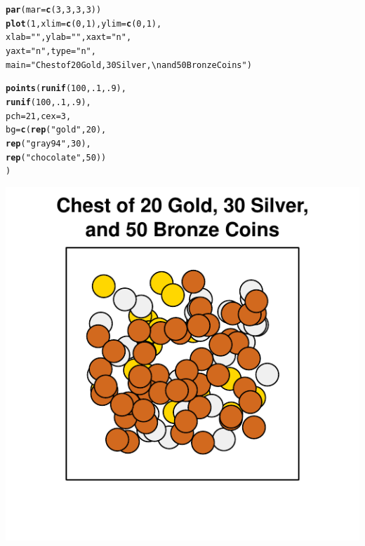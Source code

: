 \documentclass{tufte-book}\usepackage[]{graphicx}\usepackage[]{color}
\makeatletter
\def\maxwidth{ %
  \ifdim\Gin@nat@width>\linewidth
    \linewidth
  \else
    \Gin@nat@width
  \fi
}
\newcommand{\hlnum}[1]{\textcolor[rgb]{0.686,0.059,0.569}{#1}}%
\newcommand{\hlstr}[1]{\textcolor[rgb]{0.192,0.494,0.8}{#1}}%
\newcommand{\hlstd}[1]{\textcolor[rgb]{0.345,0.345,0.345}{#1}}%
\newcommand{\hlkwc}[1]{\textcolor[rgb]{0.333,0.667,0.333}{#1}}%
\newcommand{\hlkwd}[1]{\textcolor[rgb]{0.737,0.353,0.396}{\textbf{#1}}}%
\newenvironment{kframe}{%
 \def\at@end@of@kframe{}%
 \ifinner\ifhmode%
  \def\at@end@of@kframe{\end{minipage}}%
  \begin{minipage}{\columnwidth}%
 \fi\fi%
 \def\FrameCommand##1{\hskip\@totalleftmargin \hskip-\fboxsep
 \colorbox{shadecolor}{##1}\hskip-\fboxsep
     \hskip-\linewidth \hskip-\@totalleftmargin \hskip\columnwidth}%
 \MakeFramed {\advance\hsize-\width
   \@totalleftmargin\z@ \linewidth\hsize
   \@setminipage}}%
 {\par\unskip\endMakeFramed%
 \at@end@of@kframe}
\newenvironment{knitrout}{}{} %
\makeatother
\begin{document}
\begin{marginfigure}
\begin{tiny}
\begin{knitrout}
\color{fgcolor}\begin{kframe}
\begin{alltt}
\hlkwd{par}\hlstd{(}\hlkwc{mar} \hlstd{=} \hlkwd{c}\hlstd{(}\hlnum{3}\hlstd{,} \hlnum{3}\hlstd{,} \hlnum{3}\hlstd{,} \hlnum{3}\hlstd{))}
\hlkwd{plot}\hlstd{(}\hlnum{1}\hlstd{,} \hlkwc{xlim} \hlstd{=} \hlkwd{c}\hlstd{(}\hlnum{0}\hlstd{,} \hlnum{1}\hlstd{),} \hlkwc{ylim} \hlstd{=} \hlkwd{c}\hlstd{(}\hlnum{0}\hlstd{,} \hlnum{1}\hlstd{),}
     \hlkwc{xlab} \hlstd{=} \hlstr{""}\hlstd{,} \hlkwc{ylab} \hlstd{=} \hlstr{""}\hlstd{,} \hlkwc{xaxt} \hlstd{=} \hlstr{"n"}\hlstd{,}
     \hlkwc{yaxt} \hlstd{=} \hlstr{"n"}\hlstd{,} \hlkwc{type} \hlstd{=} \hlstr{"n"}\hlstd{,}
     \hlkwc{main} \hlstd{=} \hlstr{"Chest of 20 Gold, 30 Silver,\textbackslash{}nand 50 Bronze Coins"}\hlstd{)}

\hlkwd{points}\hlstd{(}\hlkwd{runif}\hlstd{(}\hlnum{100}\hlstd{,} \hlnum{.1}\hlstd{,} \hlnum{.9}\hlstd{),}
       \hlkwd{runif}\hlstd{(}\hlnum{100}\hlstd{,} \hlnum{.1}\hlstd{,} \hlnum{.9}\hlstd{),}
       \hlkwc{pch} \hlstd{=} \hlnum{21}\hlstd{,} \hlkwc{cex} \hlstd{=} \hlnum{3}\hlstd{,}
       \hlkwc{bg} \hlstd{=} \hlkwd{c}\hlstd{(}\hlkwd{rep}\hlstd{(}\hlstr{"gold"}\hlstd{,} \hlnum{20}\hlstd{),}
              \hlkwd{rep}\hlstd{(}\hlstr{"gray94"}\hlstd{,} \hlnum{30}\hlstd{),}
              \hlkwd{rep}\hlstd{(}\hlstr{"chocolate"}\hlstd{,} \hlnum{50}\hlstd{))}
       \hlstd{)}
\end{alltt}
\end{kframe}
\includegraphics[width=\maxwidth]{figure/unnamed-chunk-39-1} 

\end{knitrout}
\end{tiny}
\end{marginfigure}
\end{document}
